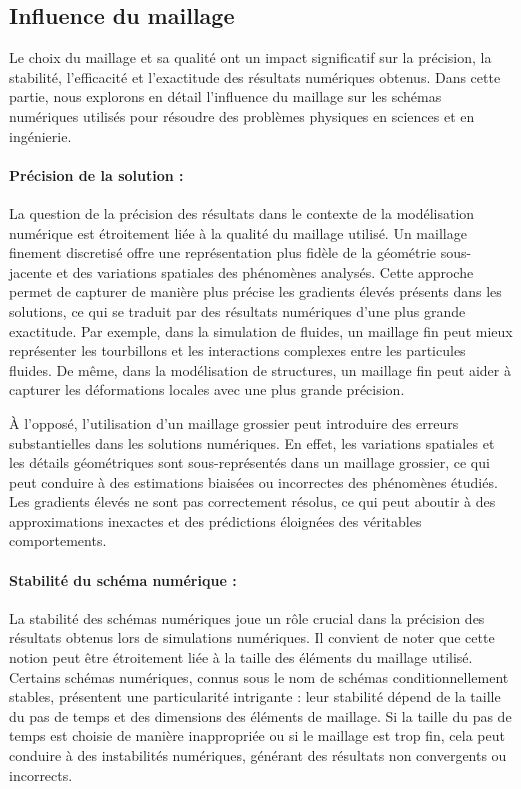 \subsection{Influence du maillage}

Le choix du maillage et sa qualité ont un impact significatif sur la précision, la stabilité, l'efficacité et l'exactitude des résultats numériques obtenus. Dans cette partie, nous explorons en détail l'influence du maillage sur les schémas numériques utilisés pour résoudre des problèmes physiques en sciences et en ingénierie.

\paragraph{Précision de la solution :}

La question de la précision des résultats dans le contexte de la modélisation numérique est étroitement liée à la qualité du maillage utilisé. Un maillage finement discretisé offre une représentation plus fidèle de la géométrie sous-jacente et des variations spatiales des phénomènes analysés. Cette approche permet de capturer de manière plus précise les gradients élevés présents dans les solutions, ce qui se traduit par des résultats numériques d'une plus grande exactitude. Par exemple, dans la simulation de fluides, un maillage fin peut mieux représenter les tourbillons et les interactions complexes entre les particules fluides. De même, dans la modélisation de structures, un maillage fin peut aider à capturer les déformations locales avec une plus grande précision.

À l'opposé, l'utilisation d'un maillage grossier peut introduire des erreurs substantielles dans les solutions numériques. En effet, les variations spatiales et les détails géométriques sont sous-représentés dans un maillage grossier, ce qui peut conduire à des estimations biaisées ou incorrectes des phénomènes étudiés. Les gradients élevés ne sont pas correctement résolus, ce qui peut aboutir à des approximations inexactes et des prédictions éloignées des véritables comportements.

\paragraph{Stabilité du schéma numérique :}

La stabilité des schémas numériques joue un rôle crucial dans la précision des résultats obtenus lors de simulations numériques. Il convient de noter que cette notion peut être étroitement liée à la taille des éléments du maillage utilisé. Certains schémas numériques, connus sous le nom de schémas conditionnellement stables, présentent une particularité intrigante : leur stabilité dépend de la taille du pas de temps et des dimensions des éléments de maillage. Si la taille du pas de temps est choisie de manière inappropriée ou si le maillage est trop fin, cela peut conduire à des instabilités numériques, générant des résultats non convergents ou incorrects.

